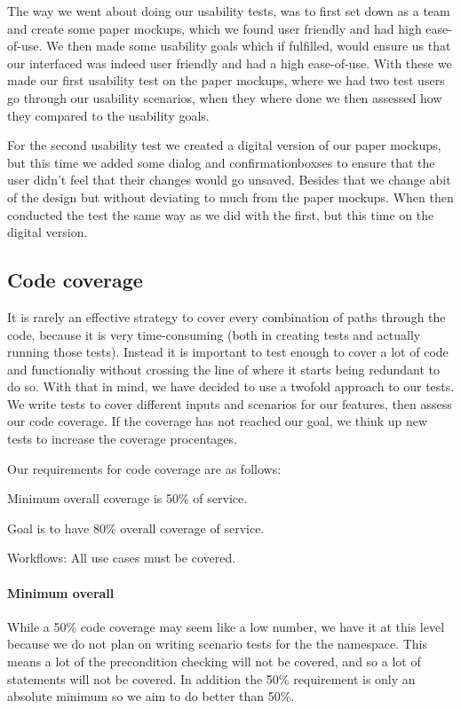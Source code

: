 The way we went about doing our usability tests, was to first set down as a team and create some paper mockups, which we found user friendly and had high ease-of-use. We then made some usability goals which if fulfilled, would ensure us that our interfaced was indeed user friendly and had a high ease-of-use. With these we made our first usability test on the paper mockups, where we had two test users go through our usability scenarios, when they where done we then assessed how they compared to the usability goals.

For the second usability test we created a digital version of our paper mockups, but this time we added some dialog and confirmationboxses to ensure that the user didn't feel that their changes would go unsaved. Besides that we change abit of the design but without deviating to much from the paper mockups. When then conducted the test the same way as we did with the first, but this time on the digital version.

\subsection{Code coverage}
\label{Testing_Strategy_Coverage}
It is rarely an effective strategy to cover every combination of paths through the code, because it is very time-consuming (both in creating tests and actually running those tests). Instead it is important to test enough to cover a lot of code and functionaliy without crossing the line of where it starts being redundant to do so\cite{WoT}. With that in mind, we have decided to use a twofold approach to our tests. We write tests to cover different inputs and scenarios for our features, then assess our code coverage. If the coverage has not reached our goal, we think up new tests to increase the coverage procentages.

Our requirements for code coverage are as follows:
\begin{my_itemize}
\item Minimum overall coverage is 50\% of service.
\item Goal is to have 80\% overall coverage of service.
\item Workflows: All use cases must be covered.
\end{my_itemize}

\paragraph{Minimum overall}
While a 50\% code coverage may seem like a low number, we have it at this level because we do not plan on writing scenario tests for the the  namespace. This means a lot of the precondition checking will not be covered, and so a lot of statements will not be covered. In addition the 50\% requirement is only an absolute minimum so we aim to do better than 50\%.

